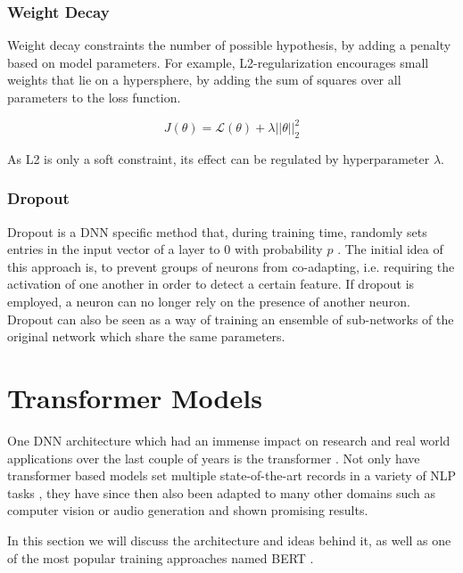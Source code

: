 \subsubsection{Weight Decay}
Weight decay constraints the number of possible hypothesis, by adding a penalty based on model parameters. For example, L2-regularization encourages small weights that lie on a hypersphere, by adding the sum of squares over all parameters to the loss function.

\begin{equation}
    J(\theta) = \mathcal{L}(\theta) + \lambda ||\theta||_2^2
\end{equation}

As L2 is only a soft constraint, its effect can be regulated by hyperparameter $\lambda$.

\subsubsection{Dropout}
Dropout is a DNN specific method that, during training time, randomly sets entries in the input vector of a layer to $0$ with probability $p$ \cite{DBLP:journals/corr/abs-1207-0580}. The initial idea of this approach is, to prevent groups of neurons from co-adapting, i.e. requiring the activation of one another in order to detect a certain feature. If dropout is employed, a neuron can no longer rely on the presence of another neuron. Dropout can also be seen as a way of training an ensemble of sub-networks of the original network which share the same parameters.


\section{Transformer Models}
One DNN architecture which had an immense impact on research and real world applications over the last couple of years is the transformer \cite{vaswani2017attention}. Not only have transformer based models set multiple state-of-the-art records in a variety of NLP tasks \cite{devlin-etal-2019-bert, DBLP:journals/corr/abs-1907-11692, DBLP:journals/corr/abs-2003-10555, DBLP:journals/corr/abs-1909-08053, DBLP:journals/corr/abs-2005-14165}, they have since then also been adapted to many other domains such as computer vision \cite{DBLP:journals/corr/abs-2010-11929} or audio generation \cite{https://doi.org/10.48550/arxiv.2005.00341} and shown promising results.

In this section we will discuss the architecture and ideas behind it, as well as one of the most popular training approaches named BERT \cite{devlin-etal-2019-bert}.

